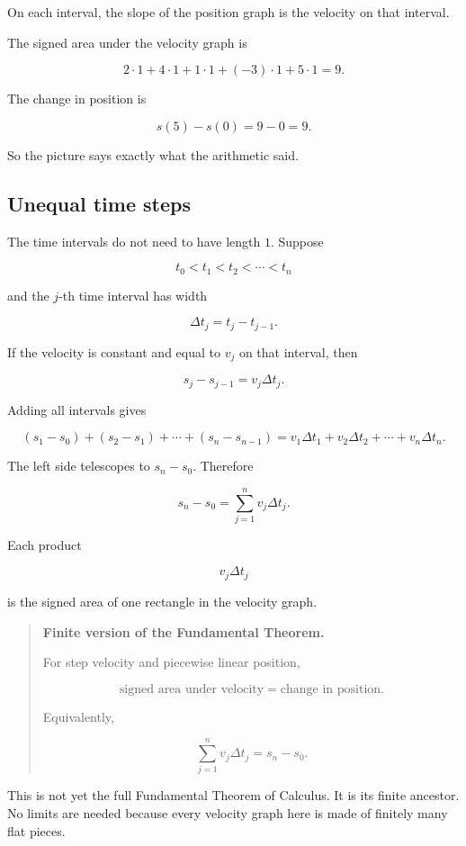 On each interval, the slope of the position graph is the velocity on that interval.

The signed area under the velocity graph is

\[
2\cdot 1+4\cdot 1+1\cdot 1+(-3)\cdot 1+5\cdot 1=9.
\]

The change in position is

\[
s(5)-s(0)=9-0=9.
\]

So the picture says exactly what the arithmetic said.

\subsection{Unequal time steps}

The time intervals do not need to have length \(1\). Suppose

\[
t_0<t_1<t_2<\cdots<t_n
\]

and the \(j\)-th time interval has width

\[
\Delta t_j=t_j-t_{j-1}.
\]

If the velocity is constant and equal to \(v_j\) on that interval, then

\[
s_j-s_{j-1}=v_j\Delta t_j.
\]

Adding all intervals gives

\[
(s_1-s_0)+(s_2-s_1)+\cdots+(s_n-s_{n-1})
=
v_1\Delta t_1+v_2\Delta t_2+\cdots+v_n\Delta t_n.
\]

The left side telescopes to \(s_n-s_0\). Therefore

\[
\boxed{s_n-s_0=\sum_{j=1}^{n} v_j\Delta t_j.}
\]

Each product

\[
v_j\Delta t_j
\]

is the signed area of one rectangle in the velocity graph.

\begin{quote}
\textbf{Finite version of the Fundamental Theorem.}

For step velocity and piecewise linear position,

\[
\boxed{\text{signed area under velocity}=\text{change in position}.}
\]

Equivalently,

\[
\boxed{\sum_{j=1}^{n} v_j\Delta t_j=s_n-s_0.}
\]
\end{quote}

This is not yet the full Fundamental Theorem of Calculus. It is its finite ancestor. No limits are needed because every velocity graph here is made of finitely many flat pieces.

